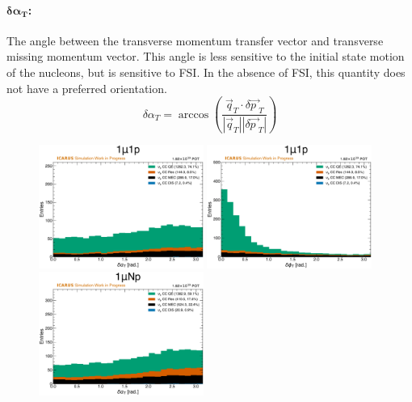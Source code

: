 \paragraph{$\mathbf{\delta \alpha_T}$:}
The angle between the transverse momentum transfer vector and transverse missing momentum vector. This angle is less sensitive to the initial state motion of the nucleons, but is sensitive to FSI. In the absence of FSI, this quantity does not have a preferred orientation.
\begin{equation}
    \delta \alpha_T = \arccos\left(\frac{\vec{q}_T \cdot \delta \vec{p\ }_T}{|\vec{q}_T||\delta \vec{p\ }_T|}\right)
\end{equation}

\begin{figure}[!htb]
    \centering
    \includegraphics[width=0.48\textwidth]{figures/neutrino_selection/signal_hist1d_1mu1p_delta_alphaT.pdf}
    \includegraphics[width=0.48\textwidth]{figures/neutrino_selection/signal_hist1d_1mu1p_delta_phiT.pdf}
    \\
    \includegraphics[width=0.48\textwidth]{figures/neutrino_selection/signal_hist1d_1muNp_delta_alphaT.pdf}

\end{figure}
